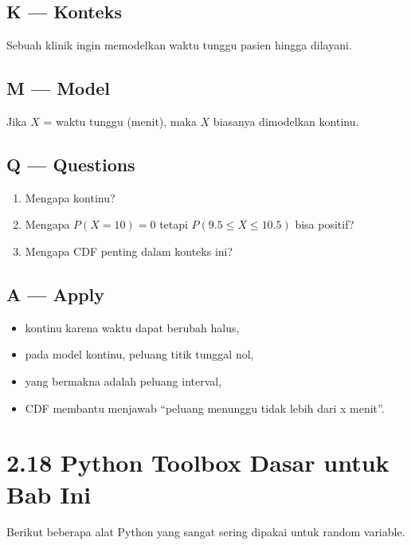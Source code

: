 \documentclass[
  letterpaper,
  DIV=11,
  numbers=noendperiod]{scrreprt}
\providecommand{\tightlist}{%
  \setlength{\itemsep}{0pt}\setlength{\parskip}{0pt}}
\begin{document}
\subsection{K --- Konteks}\label{k-konteks-9}

Sebuah klinik ingin memodelkan waktu tunggu pasien hingga dilayani.

\subsection{M --- Model}\label{m-model-9}

Jika \(X\) = waktu tunggu (menit), maka \(X\) biasanya dimodelkan
kontinu.

\subsection{Q --- Questions}\label{q-questions-9}

\begin{enumerate}
\def\labelenumi{\arabic{enumi}.}
\tightlist
\item
  Mengapa kontinu?
\item
  Mengapa \(P(X=10)=0\) tetapi \(P(9.5 \le X \le 10.5)\) bisa positif?
\item
  Mengapa CDF penting dalam konteks ini?
\end{enumerate}

\subsection{A --- Apply}\label{a-apply-9}

\begin{itemize}
\tightlist
\item
  kontinu karena waktu dapat berubah halus,
\item
  pada model kontinu, peluang titik tunggal nol,
\item
  yang bermakna adalah peluang interval,
\item
  CDF membantu menjawab ``peluang menunggu tidak lebih dari x menit''.
\end{itemize}

\section{2.18 Python Toolbox Dasar untuk Bab
Ini}\label{python-toolbox-dasar-untuk-bab-ini}

Berikut beberapa alat Python yang sangat sering dipakai untuk random
variable.
\end{document}
